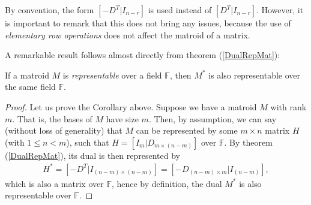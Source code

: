 By convention, the form $[-D^T |I_{n-r}]$ is used instead of $[D^T |I_{n-r}]$. However, it is important to remark that this does not bring any issues, because the use of \textit{elementary row operations} does not affect the matroid of a matrix. 

A remarkable result follows almost directly from theorem (\ref{DualRepMat}):

\begin{corollary} \label{corollaryrepdual}
    If a matroid $M$ is \textit{representable} over a field $\mathbb{F}$, then $M ^* $ is also representable over the same field $\mathbb{F}$.
\end{corollary}

\begin{proof}
    Let us prove the Corollary above. Suppose we have a matroid $M$ with rank $m$. That is, the bases of $M$ have size $m$. Then, by assumption, we can say (without loss of generality) that $M$ can be represented by some $m \times n$ matrix $H$ (with $1\leq n < m$), such that $H=[I_{m}|D_{m \times (n-m)}]$ over $\mathbb{F}$. By theorem (\ref{DualRepMat}), its dual is then represented by 
    \begin{align*}
    H^*=[-D^T|I_{(n-m) \times (n-m)}]=[-D_{(n-m) \times m}|I_{(n-m)}],
    \end{align*}
    which is also a matrix over $\mathbb{F}$, hence by definition, the dual $M^*$ is also representable over $\mathbb{F}.$
\end{proof}

